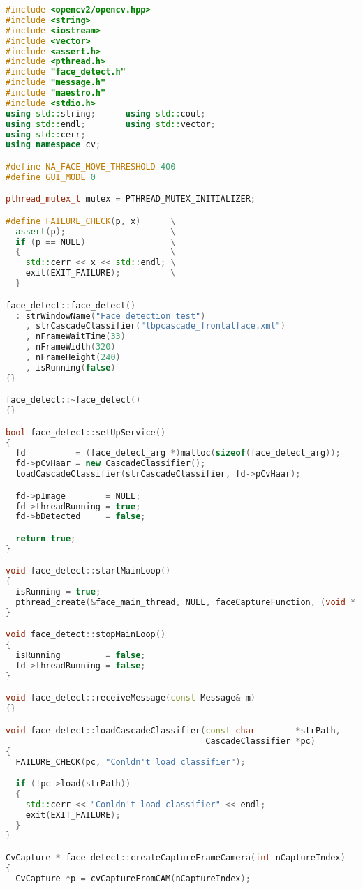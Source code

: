 \begin{lstlisting}[caption=face-detect.cpp,language=C++]
#include <opencv2/opencv.hpp>
#include <string>
#include <iostream>
#include <vector>
#include <assert.h>
#include <pthread.h>
#include "face_detect.h"
#include "message.h"
#include "maestro.h"
#include <stdio.h>
using std::string;      using std::cout;
using std::endl;        using std::vector;
using std::cerr;
using namespace cv;

#define NA_FACE_MOVE_THRESHOLD 400
#define GUI_MODE 0

pthread_mutex_t mutex = PTHREAD_MUTEX_INITIALIZER;

#define FAILURE_CHECK(p, x)      \
  assert(p);                     \
  if (p == NULL)                 \
  {                              \
    std::cerr << x << std::endl; \
    exit(EXIT_FAILURE);          \
  }

face_detect::face_detect()
  : strWindowName("Face detection test")
    , strCascadeClassifier("lbpcascade_frontalface.xml")
    , nFrameWaitTime(33)
    , nFrameWidth(320)
    , nFrameHeight(240)
    , isRunning(false)
{}

face_detect::~face_detect()
{}

bool face_detect::setUpService()
{
  fd          = (face_detect_arg *)malloc(sizeof(face_detect_arg));
  fd->pCvHaar = new CascadeClassifier();
  loadCascadeClassifier(strCascadeClassifier, fd->pCvHaar);

  fd->pImage        = NULL;
  fd->threadRunning = true;
  fd->bDetected     = false;

  return true;
}

void face_detect::startMainLoop()
{
  isRunning = true;
  pthread_create(&face_main_thread, NULL, faceCaptureFunction, (void *)_instance);
}

void face_detect::stopMainLoop()
{
  isRunning         = false;
  fd->threadRunning = false;
}

void face_detect::receiveMessage(const Message& m)
{}

void face_detect::loadCascadeClassifier(const char        *strPath,
                                        CascadeClassifier *pc)
{
  FAILURE_CHECK(pc, "Conldn't load classifier");

  if (!pc->load(strPath))
  {
    std::cerr << "Conldn't load classifier" << endl;
    exit(EXIT_FAILURE);
  }
}

CvCapture * face_detect::createCaptureFrameCamera(int nCaptureIndex)
{
  CvCapture *p = cvCaptureFromCAM(nCaptureIndex);


\end{lstlisting}
